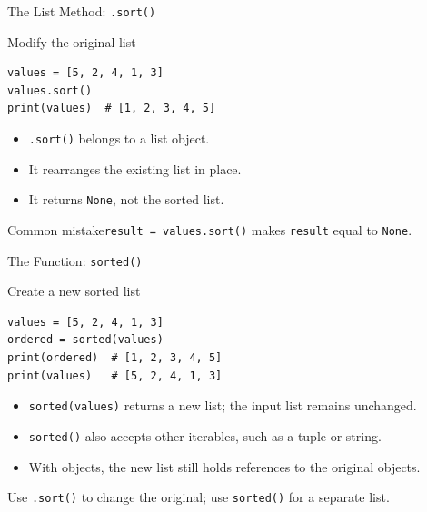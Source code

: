 \documentclass[aspectratio=169,10pt]{beamer}
\begin{document}

\begin{frame}[fragile]{The List Method: \texttt{.sort()}}
\small
\begin{block}{Modify the original list}
\footnotesize
\begin{verbatim}
values = [5, 2, 4, 1, 3]
values.sort()
print(values)  # [1, 2, 3, 4, 5]
\end{verbatim}
\end{block}
\begin{itemize}
 \item \texttt{.sort()} belongs to a list object.
 \item It rearranges the existing list in place.
 \item It returns \texttt{None}, not the sorted list.
\end{itemize}
\begin{alertblock}{Common mistake}\texttt{result = values.sort()} makes \texttt{result} equal to \texttt{None}.\end{alertblock}
\end{frame}

\begin{frame}[fragile]{The Function: \texttt{sorted()}}
\small
\begin{block}{Create a new sorted list}
\footnotesize
\begin{verbatim}
values = [5, 2, 4, 1, 3]
ordered = sorted(values)
print(ordered)  # [1, 2, 3, 4, 5]
print(values)   # [5, 2, 4, 1, 3]
\end{verbatim}
\end{block}
\begin{itemize}
 \item \texttt{sorted(values)} returns a new list; the input list remains unchanged.
 \item \texttt{sorted()} also accepts other iterables, such as a tuple or string.
 \item With objects, the new list still holds references to the original objects.
\end{itemize}
\begin{keyidea}Use \texttt{.sort()} to change the original; use \texttt{sorted()} for a separate list.\end{keyidea}
\end{frame}
\end{document}
